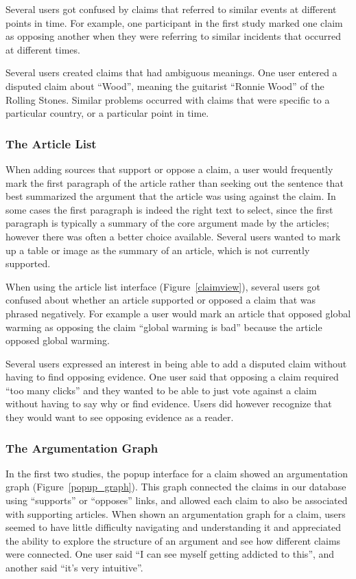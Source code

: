\documentclass{www2010-accepted}
\begin{document}
Several users got confused by claims that referred to similar events at different points in time. For example, one participant in the first study marked one claim as opposing another  when they were referring to similar incidents that occurred at different times. 

Several users created claims that had ambiguous meanings. One user entered a disputed claim about ``Wood'', meaning the guitarist ``Ronnie Wood'' of the Rolling Stones. Similar problems occurred with claims that were specific to a particular country, or a particular point in time. 


\subsubsection{The Article List}

When adding sources that support or oppose a claim, a user would frequently mark the first paragraph of the article rather than seeking out the sentence that best summarized the argument that the article was using against the claim. In some cases the first paragraph is indeed the right text to select, since the first paragraph is typically a summary of the core argument made by the articles; however there was often a better choice available. Several users wanted to mark up a table or image as the summary of an article, which is not currently supported.

When using the article list interface (Figure~\ref{claimview}), several users got confused about whether an article supported or opposed a claim that was phrased negatively. For example a user would mark an article that opposed global warming as opposing the claim ``global warming is bad'' because the article opposed global warming.

Several users expressed an interest in being able to add a disputed claim without having to find opposing evidence. One user said that opposing a claim required ``too many clicks'' and they wanted to be able to just vote against a claim without having to say why or find evidence. Users did however recognize that they would want to see opposing evidence as a reader.

\subsubsection{The Argumentation Graph}

In the first two studies, the popup interface for a claim showed an argumentation graph (Figure~\ref{popup_graph}). This graph connected the claims in our database using ``supports'' or ``opposes'' links, and allowed each claim to also be associated with supporting articles. When shown an argumentation graph for a claim, users seemed to have little difficulty navigating and understanding it and appreciated the ability to explore the structure of an argument and see how different claims were connected. One user said ``I can see myself getting addicted to this'', and another said ``it's very intuitive''.
\end{document}
